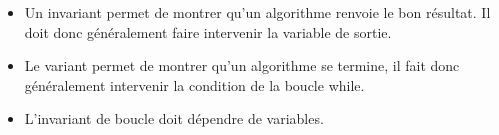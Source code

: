 \begin{itemize}
\item Un invariant permet de montrer qu'un algorithme renvoie le bon résultat. Il doit donc généralement faire intervenir la variable de sortie.
\item Le variant permet de montrer qu'un algorithme se termine, il fait donc généralement intervenir la condition de la boucle while.
\item L'invariant de boucle doit dépendre de variables.
\end{itemize}
